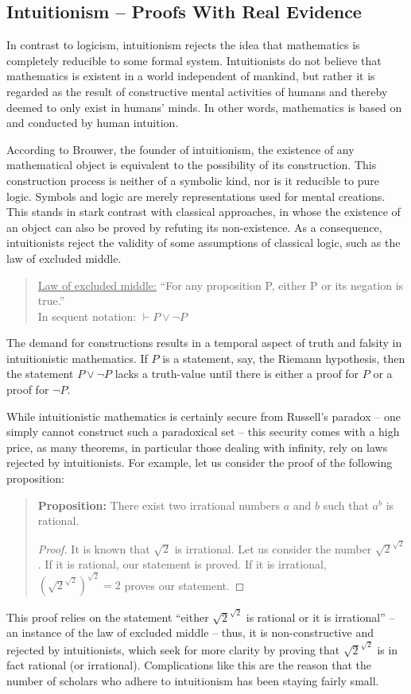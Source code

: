 \documentclass{article}
\begin{document}
\subsection{Intuitionism -- Proofs With Real Evidence}\label{ssec_intuitionism}
In contrast to logicism, intuitionism rejects the idea that mathematics is completely reducible to some formal system. Intuitionists do not believe that mathematics is existent in a world independent of mankind, but rather it is regarded as the result of constructive mental activities of humans and thereby deemed to only exist in humans' minds. In other words, mathematics is based on and conducted by human intuition.

According to Brouwer, the founder of intuitionism, the existence of any mathematical object is equivalent to the possibility of its construction.
This construction process is neither of a symbolic kind, nor is it reducible to pure logic. Symbols and logic are merely representations used for mental creations.
This stands in stark contrast with classical approaches, in whose the existence of an object can also be proved by refuting its non-existence. As a consequence, intuitionists reject the validity of some assumptions of classical logic, such as the law of excluded middle.
\begin{quote}
\underline{Law of excluded middle:} ``For any proposition P, either P or its negation is true.''\\ 
In sequent notation: $\vdash P\lor\lnot P$
\end{quote}
The demand for constructions results in a temporal aspect of truth and falsity in intuitionistic mathematics. If $P$ is a statement, say, the Riemann hypothesis, then the statement $P\lor\lnot P$ lacks a truth-value until there is either a proof for $P$ or a proof for $\lnot P$.

While intuitionistic mathematics is certainly secure from Russell's paradox -- one simply cannot construct such a paradoxical set -- this security comes with a high price, as many theorems, in particular those dealing with infinity, rely on laws rejected by intuitionists. For example, let us consider the proof of the following proposition:
\begin{quote}
\textbf{Proposition:} There exist two irrational numbers $a$ and $b$ such that $a^b$ is rational.
\vspace{-2em}
\begin{proof}
	It is known that $\sqrt{2}$ is irrational. Let us consider the number $\sqrt{2}^{\sqrt{2}}$. If it is rational, our statement is proved. If it is irrational, $(\sqrt{2}^{\sqrt{2}})^{\sqrt{2}}=2$ proves our statement.
\end{proof}
\end{quote}
This proof relies on the statement ``either $\sqrt{2}^{\sqrt{2}}$ is rational or it is irrational'' -- an instance of the law of excluded middle -- thus, it is non-constructive and rejected by intuitionists, which seek for more clarity by proving that $\sqrt{2}^{\sqrt{2}}$ is in fact rational (or irrational). Complications like this are the reason that the number of scholars who adhere to intuitionism has been staying fairly small.
\end{document}
